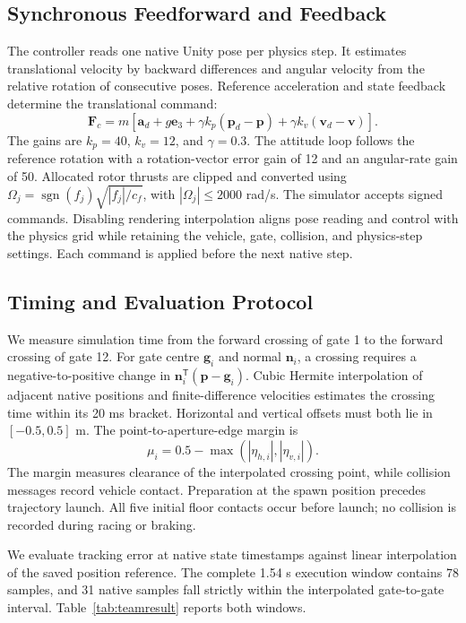 \documentclass[letterpaper,10pt,conference]{ieeeconf}
\begin{document}
\subsection{Synchronous Feedforward and Feedback}
The controller reads one native Unity pose per physics step.
It estimates translational velocity by backward differences and angular velocity from the relative rotation of consecutive poses.
Reference acceleration and state feedback determine the translational command:
\begin{equation}
\bm F_c=m\left[\bm a_d+g\bm e_3+\gamma k_p(\bm p_d-\bm p)
+\gamma k_v(\bm v_d-\bm v)\right].
\end{equation}
The gains are $k_p=40$, $k_v=12$, and $\gamma=0.3$.
The attitude loop follows the reference rotation with a rotation-vector error gain of 12 and an angular-rate gain of 50.
Allocated rotor thrusts are clipped and converted using $\Omega_j=\operatorname{sgn}(f_j)\sqrt{|f_j|/c_f}$, with $|\Omega_j|\leq2000$ rad/s.
The simulator accepts signed commands.
Disabling rendering interpolation aligns pose reading and control with the physics grid while retaining the vehicle, gate, collision, and physics-step settings.
Each command is applied before the next native step.

\subsection{Timing and Evaluation Protocol}
We measure simulation time from the forward crossing of gate 1 to the forward crossing of gate 12.
For gate centre $\bm g_i$ and normal $\bm n_i$, a crossing requires a negative-to-positive change in $\bm n_i^\mathsf T(\bm p-\bm g_i)$.
Cubic Hermite interpolation of adjacent native positions and finite-difference velocities estimates the crossing time within its 20 ms bracket.
Horizontal and vertical offsets must both lie in $[-0.5,0.5]$ m.
The point-to-aperture-edge margin is
\begin{equation}
\mu_i=0.5-\max(|\eta_{h,i}|,|\eta_{v,i}|).
\end{equation}
The margin measures clearance of the interpolated crossing point, while collision messages record vehicle contact.
Preparation at the spawn position precedes trajectory launch.
All five initial floor contacts occur before launch; no collision is recorded during racing or braking.

We evaluate tracking error at native state timestamps against linear interpolation of the saved position reference.
The complete 1.54 s execution window contains 78 samples, and 31 native samples fall strictly within the interpolated gate-to-gate interval.
Table~\ref{tab:teamresult} reports both windows.
\end{document}
